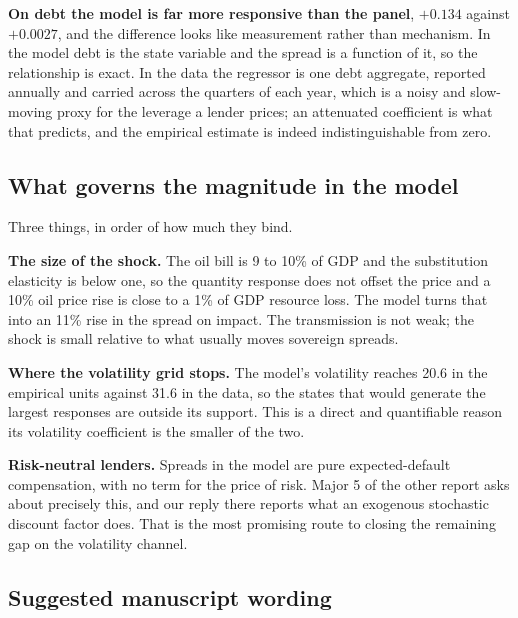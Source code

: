 \textbf{On debt the model is far more responsive than the panel}, $+0.134$
against $+0.0027$, and the difference looks like measurement rather than
mechanism. In the model debt is the state variable and the spread is a function
of it, so the relationship is exact. In the data the regressor is one debt
aggregate, reported annually and carried across the quarters of each year, which
is a noisy and slow-moving proxy for the leverage a lender prices; an attenuated
coefficient is what that predicts, and the empirical estimate is indeed
indistinguishable from zero.

\subsection*{What governs the magnitude in the model}

Three things, in order of how much they bind.

\textbf{The size of the shock.} The oil bill is 9 to 10\% of GDP and the
substitution elasticity is below one, so the quantity response does not offset
the price and a 10\% oil price rise is close to a 1\% of GDP resource loss. The
model turns that into an 11\% rise in the spread on impact. The transmission is
not weak; the shock is small relative to what usually moves sovereign spreads.

\textbf{Where the volatility grid stops.} The model's volatility reaches 20.6 in
the empirical units against 31.6 in the data, so the states that would generate
the largest responses are outside its support. This is a direct and quantifiable
reason its volatility coefficient is the smaller of the two.

\textbf{Risk-neutral lenders.} Spreads in the model are pure expected-default
compensation, with no term for the price of risk. Major 5 of the other report
asks about precisely this, and our reply there reports what an exogenous
stochastic discount factor does. That is the most promising route to closing the
remaining gap on the volatility channel.

\subsection*{Suggested manuscript wording}

